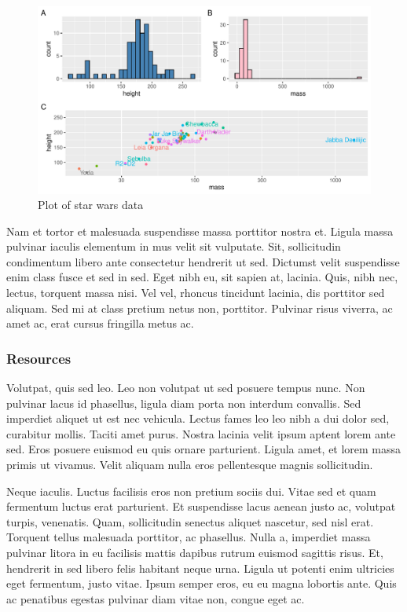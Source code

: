 \documentclass[
  11pt,
  letterpaper,
  DIV=11,
  numbers=noendperiod]{scrartcl}
\begin{document}
\begin{figure}

{\centering \includegraphics[width=1\textwidth,height=\textheight]{research-strategy-yt2_files/figure-pdf/fig-combined-1.pdf}

}

\caption{\label{fig-combined}Plot of star wars data}

\end{figure}

Nam et tortor et malesuada suspendisse massa porttitor nostra et. Ligula
massa pulvinar iaculis elementum in mus velit sit vulputate. Sit,
sollicitudin condimentum libero ante consectetur hendrerit ut sed.
Dictumst velit suspendisse enim class fusce et sed in sed. Eget nibh eu,
sit sapien at, lacinia. Quis, nibh nec, lectus, torquent massa nisi. Vel
vel, rhoncus tincidunt lacinia, dis porttitor sed aliquam. Sed mi at
class pretium netus non, porttitor. Pulvinar risus viverra, ac amet ac,
erat cursus fringilla metus ac.

\hypertarget{resources}{%
\subsubsection{Resources}\label{resources}}

Volutpat, quis sed leo. Leo non volutpat ut sed posuere tempus nunc. Non
pulvinar lacus id phasellus, ligula diam porta non interdum convallis.
Sed imperdiet aliquet ut est nec vehicula. Lectus fames leo leo nibh a
dui dolor sed, curabitur mollis. Taciti amet purus. Nostra lacinia velit
ipsum aptent lorem ante sed. Eros posuere euismod eu quis ornare
parturient. Ligula amet, et lorem massa primis ut vivamus. Velit aliquam
nulla eros pellentesque magnis sollicitudin.

Neque iaculis. Luctus facilisis eros non pretium sociis dui. Vitae sed
et quam fermentum luctus erat parturient. Et suspendisse lacus aenean
justo ac, volutpat turpis, venenatis. Quam, sollicitudin senectus
aliquet nascetur, sed nisl erat. Torquent tellus malesuada porttitor, ac
phasellus. Nulla a, imperdiet massa pulvinar litora in eu facilisis
mattis dapibus rutrum euismod sagittis risus. Et, hendrerit in sed
libero felis habitant neque urna. Ligula ut potenti enim ultricies eget
fermentum, justo vitae. Ipsum semper eros, eu eu magna lobortis ante.
Quis ac penatibus egestas pulvinar diam vitae non, congue eget ac.
\end{document}
